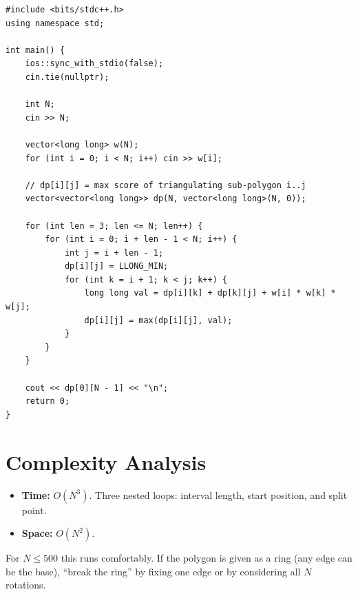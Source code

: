 \documentclass[11pt,a4paper]{article}
\begin{document}
\begin{lstlisting}
#include <bits/stdc++.h>
using namespace std;

int main() {
    ios::sync_with_stdio(false);
    cin.tie(nullptr);

    int N;
    cin >> N;

    vector<long long> w(N);
    for (int i = 0; i < N; i++) cin >> w[i];

    // dp[i][j] = max score of triangulating sub-polygon i..j
    vector<vector<long long>> dp(N, vector<long long>(N, 0));

    for (int len = 3; len <= N; len++) {
        for (int i = 0; i + len - 1 < N; i++) {
            int j = i + len - 1;
            dp[i][j] = LLONG_MIN;
            for (int k = i + 1; k < j; k++) {
                long long val = dp[i][k] + dp[k][j] + w[i] * w[k] * w[j];
                dp[i][j] = max(dp[i][j], val);
            }
        }
    }

    cout << dp[0][N - 1] << "\n";
    return 0;
}
\end{lstlisting}

\section{Complexity Analysis}
\begin{itemize}
  \item \textbf{Time:} $O(N^3)$. Three nested loops: interval length,
        start position, and split point.
  \item \textbf{Space:} $O(N^2)$.
\end{itemize}

For $N \le 500$ this runs comfortably. If the polygon is given as a
ring (any edge can be the base), ``break the ring'' by fixing one edge
or by considering all $N$ rotations.
\end{document}
